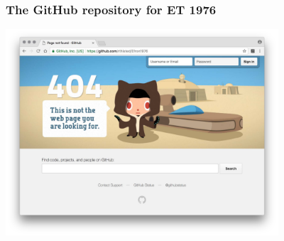 \begin{frame}
    \frametitle{The GitHub repository for ET 1976}
    \begin{center}
        \includegraphics[width=4in]{Photos/github404.pdf}        
    \end{center}  
\end{frame}
